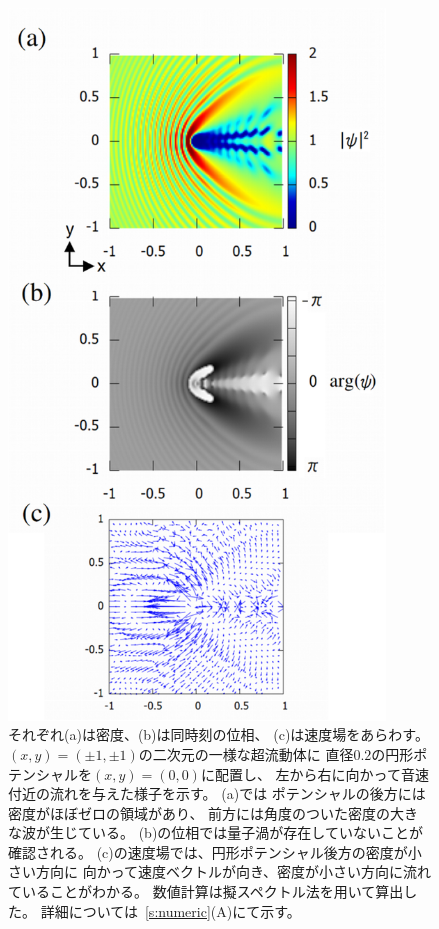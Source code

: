 \documentclass[12pt,a4paper]{jbook}
\begin{document}
		\begin{figure}[H]
			\begin{center}
				\includegraphics[width=10cm]{criticalv.eps}
				\caption{
					それぞれ(a)は密度、(b)は同時刻の位相、
					(c)は速度場をあらわす。
                    $(x,y)=(\pm1,\pm1)$の二次元の一様な超流動体に
                    直径$0.2$の円形ポテンシャルを$(x,y)=(0,0)$に配置し、
                    左から右に向かって音速付近の流れを与えた様子を示す。
                    (a)では
                    ポテンシャルの後方には密度がほぼゼロの領域があり、
                    前方には角度のついた密度の大きな波が生じている。
                    (b)の位相では量子渦が存在していないことが確認される。
                    (c)の速度場では、円形ポテンシャル後方の密度が小さい方向に
                    向かって速度ベクトルが向き、密度が小さい方向に流れていることがわかる。
                    数値計算は擬スペクトル法を用いて算出した。
                    詳細については~\ref{s:numeric}(A)にて示す。
				}
				\label{FIG:criticalv}
			\end{center}
		\end{figure}
\end{document}
